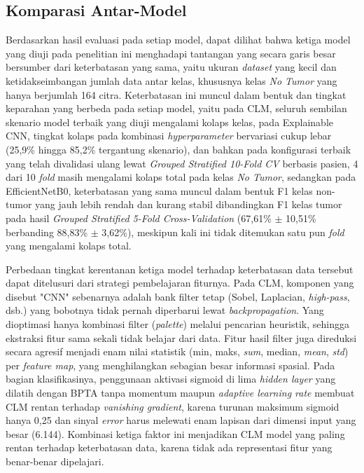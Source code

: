 \subsection{Komparasi Antar-Model}
\label{subsec:komparasi_antarmodel}
Berdasarkan hasil evaluasi pada setiap model, dapat dilihat bahwa ketiga model yang diuji pada penelitian ini menghadapi tantangan yang secara garis besar bersumber dari keterbatasan yang sama, yaitu ukuran \textit{dataset} yang kecil dan ketidakseimbangan jumlah data antar kelas, khususnya kelas \textit{No Tumor} yang hanya berjumlah 164 citra. Keterbatasan ini muncul dalam bentuk dan tingkat keparahan yang berbeda pada setiap model, yaitu pada CLM, seluruh sembilan skenario model terbaik yang diuji mengalami kolaps kelas, pada Explainable CNN, tingkat kolaps pada kombinasi \textit{hyperparameter} bervariasi cukup lebar (25,9\% hingga 85,2\% tergantung skenario), dan bahkan pada konfigurasi terbaik yang telah divalidasi ulang lewat \textit{Grouped Stratified 10-Fold CV} berbasis pasien, 4 dari 10 \textit{fold} masih mengalami kolaps total pada kelas \textit{No Tumor}, sedangkan pada EfficientNetB0, keterbatasan yang sama muncul dalam bentuk F1 kelas non-tumor yang jauh lebih rendah dan kurang stabil dibandingkan F1 kelas tumor pada hasil \textit{Grouped Stratified 5-Fold Cross-Validation} (67,61\% $\pm$ 10,51\% berbanding 88,83\% $\pm$ 3,62\%), meskipun kali ini tidak ditemukan satu pun \textit{fold} yang mengalami kolaps total.

Perbedaan tingkat kerentanan ketiga model terhadap keterbatasan data tersebut dapat ditelusuri dari strategi pembelajaran fiturnya. Pada CLM, komponen yang disebut "CNN" sebenarnya adalah bank filter tetap (Sobel, Laplacian, \textit{high-pass}, dsb.) yang bobotnya tidak pernah diperbarui lewat \textit{backpropagation}. Yang dioptimasi hanya kombinasi filter (\textit{palette}) melalui pencarian heuristik, sehingga ekstraksi fitur sama sekali tidak belajar dari data. Fitur hasil filter juga direduksi secara agresif menjadi enam nilai statistik (min, maks, \textit{sum}, median, \textit{mean}, \textit{std}) per \textit{feature map}, yang menghilangkan sebagian besar informasi spasial. Pada bagian klasifikasinya, penggunaan aktivasi sigmoid di lima \textit{hidden layer} yang dilatih dengan BPTA tanpa momentum maupun \textit{adaptive learning rate} membuat CLM rentan terhadap \textit{vanishing gradient}, karena turunan maksimum sigmoid hanya 0,25 dan sinyal \textit{error} harus melewati enam lapisan dari dimensi input yang besar (6.144). Kombinasi ketiga faktor ini menjadikan CLM model yang paling rentan terhadap keterbatasan data, karena tidak ada representasi fitur yang benar-benar dipelajari.

